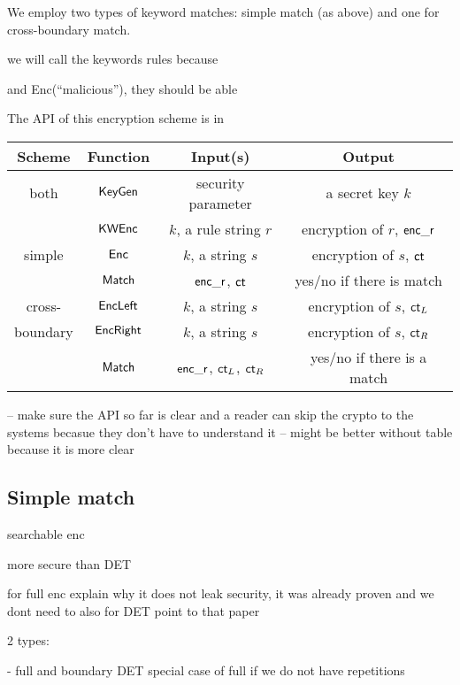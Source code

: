 We employ two types of keyword matches: simple match (as above) and one for cross-boundary match. 


we will call the keywords rules because 

 and Enc(``malicious''), they should be able 

The API of this encryption scheme is in 


\begin{tabular}{c|c|c|c}
Scheme    & Function        & Input(s) & Output \\
\hline
 both                & $\mathsf{KeyGen}$     & security parameter	      & a secret key $k$ \\ 
                 & $\mathsf{KWEnc}$	& $k$, a rule string $r$   &  encryption of $r$, $\mathsf{enc\_r}$ \\
\hline
  simple               & $\mathsf{Enc}$           &  $k$, a string $s$                        &  encryption of $s$, $\mathsf{ct}$          \\
                 & $\mathsf{Match}$  & $\mathsf{enc\_r}$, $\mathsf{ct}$ & yes/no if there is match \\
\hline
  cross-               & $\mathsf{EncLeft}$  & $k$, a string $s$ &encryption of $s$, $\mathsf{ct}_L$   \\
   boundary              & $\mathsf{EncRight}$ & $k$, a string $s$ & encryption of $s$, $\mathsf{ct}_R$  \\
                 & $\mathsf{Match}$ & $\mathsf{enc\_r}$, $\mathsf{ct}_L$, $\mathsf{ct}_R$ & yes/no if there is a match \\
\end{tabular}

-- make sure the API so far is clear and a reader can skip the crypto to the systems becasue they don't have
to understand it 
-- might be better without table because it is more clear

\subsection{Simple match}


searchable enc

more secure than DET

for full enc explain why it does not leak security, it was already proven and we dont need to 
also for DET point to that paper 

2 types:

- full and boundary
DET special case of full if we do not have repetitions


